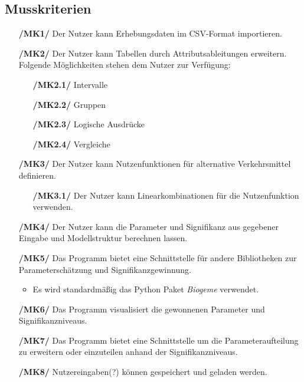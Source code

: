 \documentclass{article}
\begin{document}
\subsection{Musskriterien}
\begin{itemize}
    \item[\textbf{/MK1/}] Der Nutzer kann Erhebungsdaten im CSV-Format importieren.
    \item[\textbf{/MK2/}] Der Nutzer kann Tabellen durch Attributsableitungen erweitern.
    \subitem Folgende Möglichkeiten stehen dem Nutzer zur Verfügung:
    \begin{itemize}[leftmargin=.7in]
        \item[\textbf{/MK2.1/}] Intervalle
        \item[\textbf{/MK2.2/}] Gruppen
        \item[\textbf{/MK2.3/}] Logische Ausdrücke
        \item[\textbf{/MK2.4/}] Vergleiche
    \end{itemize}
    \item[\textbf{/MK3/}] Der Nutzer kann Nutzenfunktionen für alternative Verkehrsmittel definieren.
    \begin{itemize}[leftmargin=.7in]
        \item[\textbf{/MK3.1/}] Der Nutzer kann Linearkombinationen für die Nutzenfunktion verwenden.
    \end{itemize}
    \item[\textbf{/MK4/}] Der Nutzer kann die Parameter und Signifikanz aus gegebener Eingabe und Modellstruktur berechnen lassen.
    \item[\textbf{/MK5/}] Das Programm bietet eine Schnittstelle für andere Bibliotheken zur Parameterschätzung und Signifikanzgewinnung. 
    \begin{itemize}
        \item Es wird standardmäßig das Python Paket \textit{Biogeme} verwendet.
    \end{itemize}
    \item[\textbf{/MK6/}] Das Programm visualisiert die gewonnenen Parameter und Signifikanzniveaus.
    \item[\textbf{/MK7/}] Das Programm bietet eine Schnittstelle um die Parameteraufteilung zu erweitern oder einzuteilen anhand der Signifikanzniveaus.
    \item[\textbf{/MK8/}] Nutzereingaben(?) können gespeichert und geladen werden.
\end{itemize}
\end{document}
